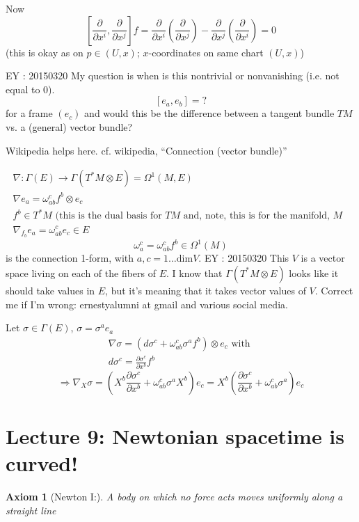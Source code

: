\documentclass[10pt, twoside]{amsart}
\newtheorem{axiom}{Axiom}
\begin{document}
\begin{multicols*}{2}
Now
\[
\left[ \frac{ \partial }{ \partial x^i} , \frac{ \partial }{ \partial x^j} \right] f = \frac{ \partial }{ \partial x^i } \left( \frac{ \partial }{ \partial x^j} \right) - \frac{ \partial }{ \partial x^j } \left( \frac{ \partial }{ \partial x^i} \right) = 0 
\]
(this is okay as on $p \in (U,x)$; $x$-coordinates on same chart $(U,x)$)

EY : 20150320 My question is when is this nontrivial or nonvanishing (i.e. not equal to $0$).
\[
[e_a,e_b] = ?
\]
for a frame $(e_c)$ and would this be the difference between a tangent bundle $TM$ vs. a (general) vector bundle?

Wikipedia helps here. cf. wikipedia, ``Connection (vector bundle)''

\[
\begin{gathered}
  \nabla : \Gamma(E) \to \Gamma(T^*M \otimes E) = \Omega^1(M,E) \\
  \nabla e_a = \omega^c_{ab} f^b \otimes e_c \\ 
  f^b \in T^*M \text{ (this is the dual basis for $TM$ and, note, this is for the manifold, $M$ } \\
  \nabla_{f_b}e_a = \omega^c_{ab} e_c \in E
\end{gathered}
\]
\[
\omega^c_a  = \omega^c_{ab} f^b \in \Omega^1(M)
\]
is the connection 1-form, with $a,c = 1 \dots \text{dim}V$.  EY : 20150320 This $V$ is a vector space living on each of the fibers of $E$.   I know that $\Gamma(T^*M \otimes E)$ looks like it should take values in $E$, but it's meaning that it takes vector values of $V$.  Correct me if I'm wrong: ernestyalumni at gmail and various social media.

Let $\sigma \in \Gamma(E)$, $\sigma = \sigma^ae_a$  
\[
\begin{gathered}
  \nabla \sigma = (d\sigma^c + \omega^c_{ab} \sigma^a f^b) \otimes e_c \text{ with } \\ 
  d\sigma^c = \frac{ \partial \sigma^c}{ \partial x^b } f^b 
\end{gathered}
\]
\[
\Longrightarrow \nabla_X \sigma = \left( X^b \frac{ \partial \sigma^c}{ \partial x^b} + \omega^c_{ab} \sigma^a X^b \right)e_c = X^b \left( \frac{ \partial \sigma^c}{ \partial x^b } + \omega^c_{ab} \sigma^a \right)e_c
\]


\section{Lecture 9: Newtonian spacetime is curved!}

\begin{axiom}[Newton I:]
  A body on which \emph{no} force acts moves uniformly along a straight line 
\end{axiom}


\end{multicols*}
\end{document}
